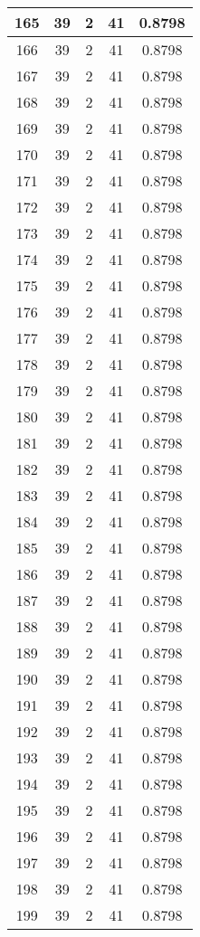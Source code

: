 \documentclass[letterpaper, 12pt]{article}
\begin{document}
\begin{longtable}{|c|c|c|c|c|}
\hline
165 & 39 & 2 & 41 & 0.8798 \\
\hline
166 & 39 & 2 & 41 & 0.8798 \\
\hline
167 & 39 & 2 & 41 & 0.8798 \\
\hline
168 & 39 & 2 & 41 & 0.8798 \\
\hline
169 & 39 & 2 & 41 & 0.8798 \\
\hline
170 & 39 & 2 & 41 & 0.8798 \\
\hline
171 & 39 & 2 & 41 & 0.8798 \\
\hline
172 & 39 & 2 & 41 & 0.8798 \\
\hline
173 & 39 & 2 & 41 & 0.8798 \\
\hline
174 & 39 & 2 & 41 & 0.8798 \\
\hline
175 & 39 & 2 & 41 & 0.8798 \\
\hline
176 & 39 & 2 & 41 & 0.8798 \\
\hline
177 & 39 & 2 & 41 & 0.8798 \\
\hline
178 & 39 & 2 & 41 & 0.8798 \\
\hline
179 & 39 & 2 & 41 & 0.8798 \\
\hline
180 & 39 & 2 & 41 & 0.8798 \\
\hline
181 & 39 & 2 & 41 & 0.8798 \\
\hline
182 & 39 & 2 & 41 & 0.8798 \\
\hline
183 & 39 & 2 & 41 & 0.8798 \\
\hline
184 & 39 & 2 & 41 & 0.8798 \\
\hline
185 & 39 & 2 & 41 & 0.8798 \\
\hline
186 & 39 & 2 & 41 & 0.8798 \\
\hline
187 & 39 & 2 & 41 & 0.8798 \\
\hline
188 & 39 & 2 & 41 & 0.8798 \\
\hline
189 & 39 & 2 & 41 & 0.8798 \\
\hline
190 & 39 & 2 & 41 & 0.8798 \\
\hline
191 & 39 & 2 & 41 & 0.8798 \\
\hline
192 & 39 & 2 & 41 & 0.8798 \\
\hline
193 & 39 & 2 & 41 & 0.8798 \\
\hline
194 & 39 & 2 & 41 & 0.8798 \\
\hline
195 & 39 & 2 & 41 & 0.8798 \\
\hline
196 & 39 & 2 & 41 & 0.8798 \\
\hline
197 & 39 & 2 & 41 & 0.8798 \\
\hline
198 & 39 & 2 & 41 & 0.8798 \\
\hline
199 & 39 & 2 & 41 & 0.8798 \\
\hline
\end{longtable}
\end{document}
